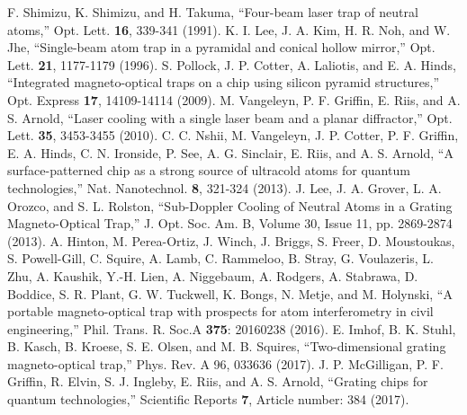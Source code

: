 \documentclass{osa-article}
\begin{document}
\begin{thebibliography}{99}
 F. Shimizu, K. Shimizu, and H. Takuma, {} ``Four-beam laser trap of neutral atoms,'' Opt. Lett. \textbf{16}, 339-341 (1991).
 K. I. Lee, J. A. Kim, H. R. Noh, and W. Jhe, {} ``Single-beam atom trap in a pyramidal and conical hollow mirror,'' Opt. Lett. \textbf{21}, 1177-1179 (1996).
 S. Pollock, J. P. Cotter, A. Laliotis, and E. A. Hinds, ``Integrated magneto-optical traps on a chip using silicon pyramid structures,'' Opt. Express \textbf{17}, 14109-14114 (2009).
  M. Vangeleyn, P. F. Griffin, E. Riis, and A. S. Arnold, {} ``Laser cooling with a single laser beam and a planar diffractor,'' Opt. Lett. \textbf{35}, 3453-3455 (2010).
 C. C. Nshii, M. Vangeleyn, J. P. Cotter, P. F. Griffin, E. A. Hinds, C. N. Ironside, P. See, A. G. Sinclair, E. Riis, and A. S. Arnold, {} ``A surface-patterned chip as a strong source of ultracold atoms for quantum technologies,'' Nat. Nanotechnol. \textbf{8}, 321-324 (2013).
 J. Lee, J. A. Grover, L. A. Orozco, and S. L. Rolston, {} ``Sub-Doppler Cooling of Neutral Atoms in a Grating Magneto-Optical Trap,'' J. Opt. Soc. Am. B,  Volume 30, Issue 11, pp. 2869-2874 (2013).
 A. Hinton, M. Perea-Ortiz, J. Winch, J. Briggs, S. Freer, D. Moustoukas, S. Powell-Gill, C. Squire, A. Lamb, C. Rammeloo, B. Stray, G. Voulazeris, L. Zhu, A. Kaushik, Y.-H. Lien, A. Niggebaum, A. Rodgers, A. Stabrawa, D. Boddice, S. R. Plant, G. W. Tuckwell, K. Bongs, N. Metje, and M. Holynski, {} ``A portable magneto-optical trap with prospects for atom interferometry in civil engineering,''  Phil. Trans. R. Soc.A \textbf{375}: 20160238 (2016).
 E. Imhof, B. K. Stuhl, B. Kasch, B. Kroese, S. E. Olsen, and M. B. Squires, {} ``Two-dimensional grating magneto-optical trap,'' Phys. Rev. A 96, 033636 (2017).
 J. P. McGilligan, P. F. Griffin, R. Elvin, S. J. Ingleby, E. Riis, and A. S. Arnold, {} ``Grating chips for quantum technologies,'' Scientific Reports \textbf{7}, Article number: 384 (2017).


\end{thebibliography}
\end{document}
